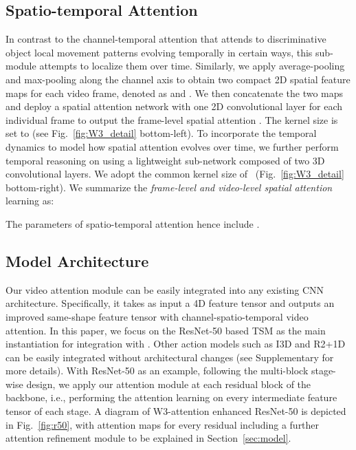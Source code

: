 \documentclass[runningheads]{llncs}
\begin{document}
\subsection{Spatio-temporal Attention}
\label{sec:spatial_att}
In contrast to the channel-temporal attention that attends to discriminative object local movement patterns evolving temporally in certain ways,  this sub-module attempts to localize them over time.
Similarly, we apply average-pooling and max-pooling along the channel axis to obtain two compact 2D spatial feature maps
for each video frame, denoted as 
and .
We then concatenate the two maps and deploy a spatial attention network  with one 2D convolutional layer 
for each individual frame to output the frame-level spatial attention .
The kernel size is set to   (see Fig.~\ref{fig:W3_detail} bottom-left).
To incorporate the temporal dynamics to model how spatial attention evolves over time,
we further perform temporal reasoning on  using a lightweight sub-network  composed of two 3D convolutional layers.
We adopt the common kernel size of ~(Fig.~\ref{fig:W3_detail} bottom-right).
We summarize the {\em frame-level and video-level spatial attention} learning as:


The parameters of spatio-temporal attention hence include .


\subsection{Model Architecture}
Our \shortname{} video attention module can be easily integrated into any existing CNN architecture. Specifically, it takes as input a 4D feature tensor and outputs an improved same-shape feature tensor with channel-spatio-temporal video attention. In this paper, we focus on the   ResNet-50 based TSM \cite{lin2019tsm} as the main instantiation for integration with \shortname{}. 
Other action models such as I3D \cite{carreira2017quo}
and R2+1D \cite{qiu2017learning,tran2018closer} can be easily integrated without
architectural changes (see Supplementary for more details).
With ResNet-50 as an example,  following the multi-block stage-wise design,
we apply our attention module at each residual block of the backbone, 
i.e., performing the attention learning on every intermediate feature tensor of each stage.
A diagram of W3-attention enhanced ResNet-50 is depicted in Fig.~\ref{fig:r50},
with attention maps for every residual
including a further attention refinement module to be explained in Section~\ref{sec:model}.
\end{document}
